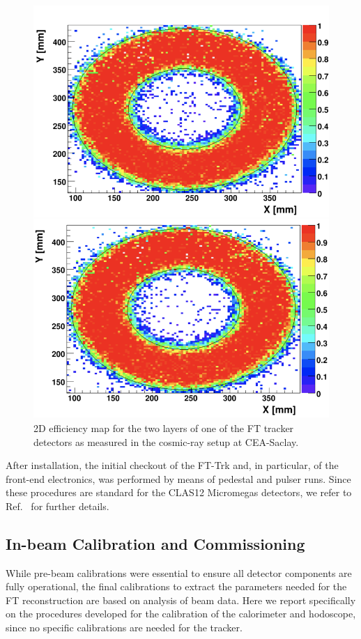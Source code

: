 \begin{figure}[htb]
 \includegraphics[width=0.9\columnwidth,keepaspectratio]{fig/fttrk_cosmic.png}
 \caption{2D efficiency map for the two layers of one of the FT tracker detectors as measured in the cosmic-ray
   setup at CEA-Saclay.}
 \label{fig:ftt_cosmic}
\end{figure}

After installation, the initial checkout of the FT-Trk and, in particular, of the front-end electronics, was performed
by means of pedestal and pulser runs. Since these procedures are standard for the CLAS12 Micromegas detectors,
we refer to Ref.~\cite{mm} for further details.

\subsection{In-beam Calibration and Commissioning}

While pre-beam calibrations were essential to ensure all detector components are fully operational, the final
calibrations to extract the parameters needed for the FT reconstruction are based on analysis of beam data.
Here we report specifically on the procedures developed for the calibration of the calorimeter and hodoscope,
since no specific calibrations are needed for the tracker.

